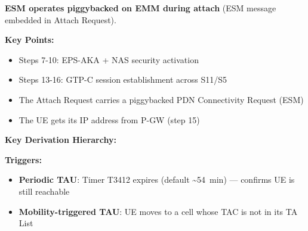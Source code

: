 \textbf{ESM operates piggybacked on EMM during attach} (ESM message embedded in Attach Request).




\CNchained{}



\textbf{Key Points:}

\begin{itemize}
\tightlist
\item
  Steps 7-10: EPS-AKA + NAS security activation
\item
  Steps 13-16: GTP-C session establishment across S11/\allowbreak{}S5
\item
  The Attach Request carries a piggybacked PDN Connectivity Request (ESM)
\item
  The UE gets its IP address from P-GW (step 15)
\end{itemize}





\textbf{Key Derivation Hierarchy:}



\textbf{Triggers:}

\begin{itemize}
\tightlist
\item
  \textbf{Periodic TAU}: Timer T3412 expires (default \textasciitilde{}54~min) — confirms UE is still reachable
\item
  \textbf{Mobility-triggered TAU}: UE moves to a cell whose TAC is not in its TA List
\end{itemize}



